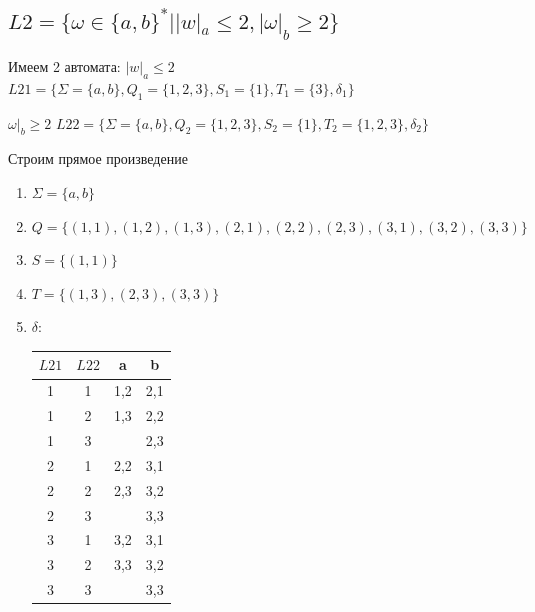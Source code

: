 \documentclass[a4paper,12pt]{article}
\begin{document}
    \subsection{ $L2 = \{\omega \in \{a,b\}^* | |w|_a \leq 2, |\omega|_b \geq 2\}$} 
    Имеем 2 автомата:
    $|w|_a \leq 2$ 
    $L21 = \{\Sigma = \{a, b\}, Q_1 = \{1, 2, 3\},S_1 = \{ 1\}, T_1 = \{3\}, \delta_1 \}$
     \begin{center}
    \end{center}
    $\omega|_b \geq 2$ 
    $L22 = \{\Sigma = \{a, b\}, Q_2 = \{1, 2, 3\},S_2 =\{ 1\}, T_2 = \{1,2,3\}, \delta_2 \}$
        \begin{center}
    \end{center}
    \newpage
    Строим прямое произведение
        \begin{enumerate}
        \item $\Sigma = \{a, b\}$
        \item $Q = \{(1, 1), (1, 2), (1, 3), (2, 1), (2, 2), (2, 3), (3, 1), (3, 2), (3, 3)\}$
        \item $S = \{(1, 1)\}$
        \item $T = \{(1, 3), (2,3), (3, 3)\}$
        \item $\delta:$
 \begin{center}
      \begin{tabular}{ | c | c | c | c | }
\hline
$L21$ & $L22$ & a & b \\ \hline
 1 & 1 & 1,2 & 2,1 \\
 1 & 2 & 1,3 & 2,2 \\
 1 & 3 &     & 2,3 \\
 2 & 1 & 2,2 & 3,1 \\
 2 & 2 & 2,3 & 3,2 \\
 2 & 3 &     & 3,3 \\
 3 & 1 & 3,2 & 3,1 \\
 3 & 2 & 3,3 & 3,2 \\
 3 & 3 &     & 3,3 \\
\hline
\end{tabular} 
 \end{center}
    \end{enumerate}
\end{document}
